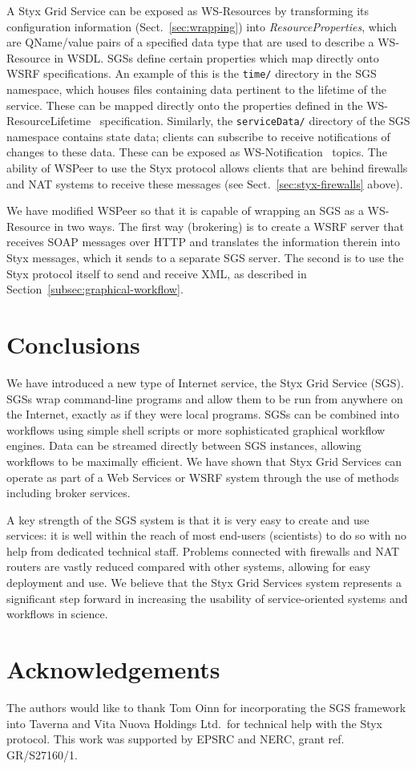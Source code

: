 \documentclass{llncs}
\begin{document}
A Styx Grid Service can be exposed as WS-Resources by transforming its configuration information (Sect.~\ref{sec:wrapping}) into {\em ResourceProperties\/}, which are QName/value pairs of a specified data type that are used to describe a WS-Resource in WSDL.  SGSs define certain properties which map directly onto WSRF specifications.  An example of this is the {\tt time/} directory in the SGS namespace, which houses files containing data pertinent to the lifetime of the service.  These can be mapped directly onto the properties defined in the WS-ResourceLifetime~\cite{wsrf-lifetime} specification.  Similarly, the {\tt serviceData/} directory of the SGS namespace contains state data; clients can subscribe to receive notifications of changes to these data.  These can be exposed as WS-Notification~\cite{wsrf-notification} topics.  The ability of WSPeer to use the Styx protocol allows clients that are behind firewalls and NAT systems to receive these messages (see Sect.~\ref{sec:styx-firewalls} above).

We have modified WSPeer so that it is capable of wrapping an SGS as a WS-Resource in two ways.  The first way (brokering) is to create a WSRF server that receives SOAP messages over HTTP and translates the information therein into Styx messages, which it sends to a separate SGS server.  The second is to use the Styx protocol itself to send and receive XML, as described in Section~\ref{subsec:graphical-workflow}.


\section{Conclusions}
We have introduced a new type of Internet service, the Styx Grid Service (SGS).  SGSs wrap command-line programs and allow them to be run from anywhere on the Internet, exactly as if they were local programs.  SGSs can be combined into workflows using simple shell scripts or more sophisticated graphical workflow engines.  Data can be streamed directly between SGS instances, allowing workflows to be maximally efficient.  We have shown that Styx Grid Services can operate as part of a Web Services or WSRF system through the use of methods including broker services.

A key strength of the SGS system is that it is very easy to create and use services: it is well within the reach of most end-users (scientists) to do so with no help from dedicated technical staff.  Problems connected with firewalls and NAT routers are vastly reduced compared with other systems, allowing for easy deployment and use.  We believe that the Styx Grid Services system represents a significant step forward in increasing the usability of service-oriented systems and workflows in science.
%

\section*{Acknowledgements}
The authors would like to thank Tom Oinn for incorporating the SGS framework into Taverna and Vita Nuova Holdings Ltd.\ for technical help with the Styx protocol.  This work was supported by EPSRC and NERC, grant ref. GR/S27160/1.

%
%


\end{document}
